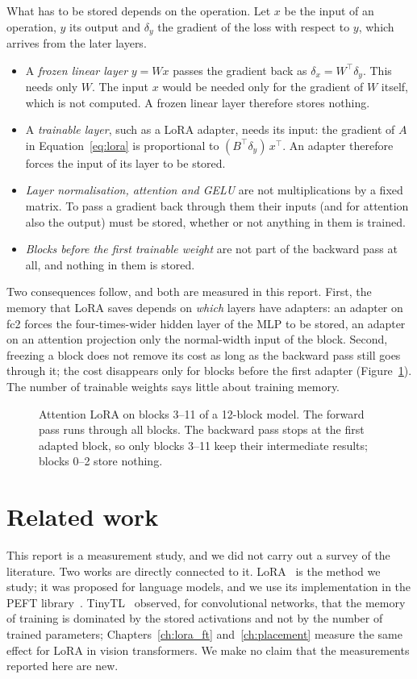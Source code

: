 What has to be stored depends on the operation. Let $x$ be the input of an operation, $y$ its output and
$\delta_y$ the gradient of the loss with respect to $y$, which arrives from the later layers.
\begin{itemize}
  \item A \emph{frozen linear layer} $y = Wx$ passes the gradient back as $\delta_x = W^\top \delta_y$. This needs only
        $W$. The input $x$ would be needed only for the gradient of $W$ itself, which is not computed. A frozen
        linear layer therefore stores nothing.
  \item A \emph{trainable layer}, such as a LoRA adapter, needs its input: the gradient of $A$ in
        Equation~\ref{eq:lora} is proportional to $(B^\top\delta_y)\,x^\top$. An adapter therefore forces the input
        of its layer to be stored.
  \item \emph{Layer normalisation, attention and GELU} are not multiplications by a fixed matrix. To pass a gradient
        back through them their inputs (and for attention also the output) must be stored, whether or not anything
        in them is trained.
  \item \emph{Blocks before the first trainable weight} are not part of the backward pass at all, and nothing in
        them is stored.
\end{itemize}
Two consequences follow, and both are measured in this report. First, the memory that LoRA saves depends on
\emph{which} layers have adapters: an adapter on fc2 forces the four-times-wider hidden layer of the MLP to be stored,
an adapter on an attention projection only the normal-width input of the block. Second, freezing a block does not
remove its cost as long as the backward pass still goes through it; the cost disappears only for blocks before the
first adapter (Figure~\ref{fig:reach}). The number of trainable weights says little about training memory.

\begin{figure}[H]
\centering

\caption{Attention LoRA on blocks 3--11 of a 12-block model. The forward pass runs through all blocks. The backward
pass stops at the first adapted block, so only blocks 3--11 keep their intermediate results; blocks 0--2 store
nothing.}
\label{fig:reach}
\end{figure}

\section{Related work}
\label{sec:related}

This report is a measurement study, and we did not carry out a survey of the literature. Two works are directly
connected to it. LoRA~\cite{hu2022lora} is the method we study; it was proposed for language models, and we use its
implementation in the PEFT library~\cite{mangrulkar2022peft}. TinyTL~\cite{cai2020tinytl} observed, for
convolutional networks, that the memory of training is dominated by the stored activations and not by the number of
trained parameters; Chapters~\ref{ch:lora_ft} and~\ref{ch:placement} measure the same effect for LoRA in vision
transformers. We make no claim that the measurements reported here are new.
